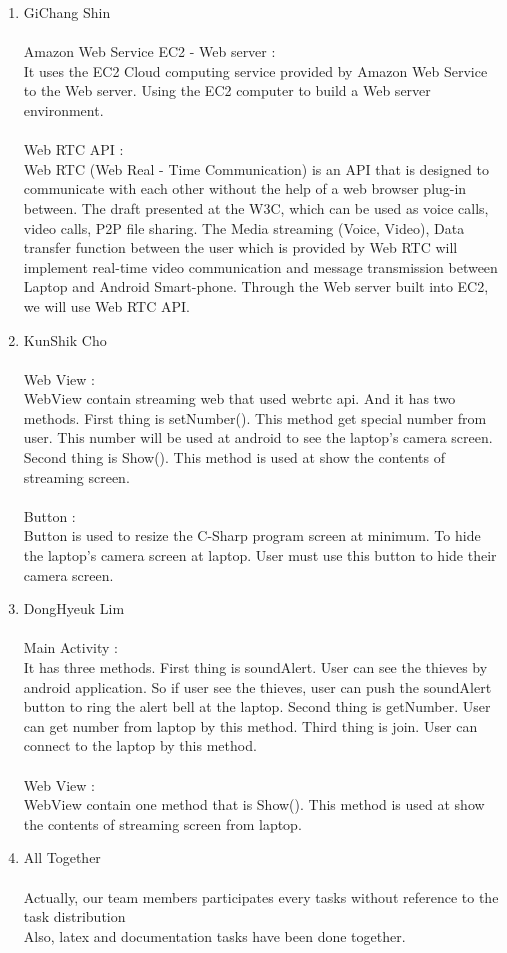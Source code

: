 \documentclass[12pt]{article}
\begin{document}
\begin{enumerate}
\item GiChang Shin\\
\\Amazon Web Service EC2 - Web server :\\
It uses the EC2 Cloud computing service provided by Amazon Web Service to the Web server. Using the EC2 computer to build a Web server environment.\\
\\Web RTC API :\\
Web RTC (Web Real - Time Communication) is an API that is designed to communicate with each other without the help of a web browser plug-in between. The draft presented at the W3C, which can be used as voice calls, video calls, P2P file sharing. The Media streaming (Voice, Video), Data transfer function between the user which is provided by Web RTC will implement real-time video communication and message transmission between Laptop and Android Smart-phone. Through the Web server built into EC2, we will use Web RTC API.\\
\item KunShik Cho\\
\\Web View :\\
 WebView contain streaming web that used webrtc api. And it has two methods. First thing is setNumber(). This method get special number from user. This number will be used at android to see the laptop’s camera screen. Second thing is Show(). This method is used at show the contents of streaming screen.\\
\\Button : \\
Button is used to resize the C-Sharp program screen at minimum. To hide the laptop’s camera screen at laptop. User must use this button to hide their camera screen. \\
\item DongHyeuk Lim\\
\\Main Activity : \\
It has three methods. First thing is soundAlert. User can see the thieves by android application. So if user see the thieves, user can push the soundAlert button to ring the alert bell at the laptop. Second thing is getNumber. User can get number from laptop by this method. Third thing is join. User can connect to the laptop by this method.\\
\\Web View : \\
WebView contain one method that is Show(). This method is used at show the contents of streaming screen from laptop.\\
\item All Together\\
\\Actually, our team members participates every tasks without reference to the task distribution\\
Also, latex and documentation tasks have been done together.\\
\end{enumerate}
\end{document}
